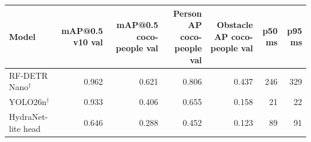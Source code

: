 \begin{tabular}{@{}lrrrrrr@{}}
\toprule
Model & mAP@0.5 v10 val & mAP@0.5 coco-people val & Person AP coco-people val & Obstacle AP coco-people val & p50 ms & p95 ms \\
\midrule
RF-DETR Nano$^\dagger$ & 0.962 & 0.621 & 0.806 & 0.437 & 246 & 329 \\
YOLO26n$^\dagger$ & 0.933 & 0.406 & 0.655 & 0.158 & 21 & 22 \\
HydraNet-lite head & 0.646 & 0.288 & 0.452 & 0.123 & 89 & 91 \\
\bottomrule
\end{tabular}
